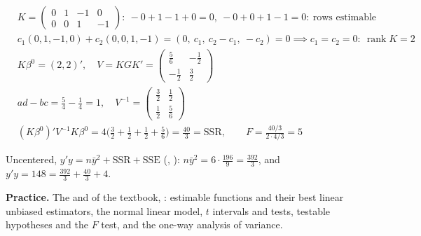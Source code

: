\documentclass[12pt]{article}
\DeclareMathOperator{\rank}{rank}
\theoremstyle{definition}
\newcommand{\boardtop}{\vspace*{-\abovedisplayskip}}
\begin{document}
\begin{board}[The same \(F\) by Theorem~\ref{h-thm-f}(a) in the design \(X\) (\(r=3\)): \(H_0\) is \(K\beta=0\), testable
(the criterion of Example~\ref{h-exm-estimable} for the rows); \(G\), \(\beta^0=(0,6,4,2)'\) as in
Example~\ref{h-exm-solution}; the rows of \(K\) are independent \(\iff\) \(\rank K=2\) (\lec{4}, \lit{Theorem~12}(c));
\(V^{-1}\) by \lec{2}, \lit{Proposition~17}:]
\boardtop
\begin{align*}
&K=\begin{pmatrix}0&1&-1&0\\0&0&1&-1\end{pmatrix}:\ -0+1-1+0=0,\ -0+0+1-1=0:\ \text{rows estimable}\\
&c_1(0,1,-1,0)+c_2(0,0,1,-1)=(0,\ c_1,\ c_2-c_1,\ -c_2)=0\implies c_1=c_2=0:\ \rank K=2\\
&K\beta^0=(2,2)',\quad V=KGK'=\begin{pmatrix}\frac56&-\frac12\\-\frac12&\frac32\end{pmatrix}\\
&ad-bc=\tfrac54-\tfrac14=1,\quad V^{-1}=\begin{pmatrix}\frac32&\frac12\\\frac12&\frac56\end{pmatrix}\\
&(K\beta^0)'V^{-1}K\beta^0=4\bigl(\tfrac32+\tfrac12+\tfrac12+\tfrac56\bigr)=\tfrac{40}3=\mathrm{SSR},\qquad
F=\frac{40/3}{2\cdot4/3}=5
\end{align*}
\end{board}
Uncentered, \(y'y=n\bar y^2+\mathrm{SSR}+\mathrm{SSE}\) (, ): \(n\bar y^2=6\cdot\frac{196}9=\frac{392}3\),
and \(y'y=148=\frac{392}3+\frac{40}3+4\).

\bigskip
\textbf{Practice.} The  and  of the textbook, : estimable functions and their best linear
unbiased estimators, the normal linear model, \(t\) intervals and tests, testable hypotheses and the \(F\) test, and the
one-way analysis of variance.
\end{document}
